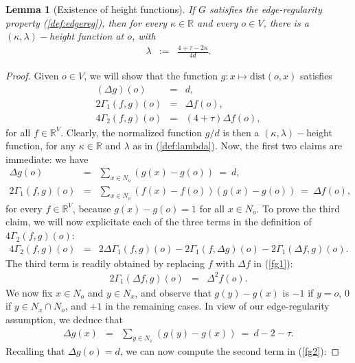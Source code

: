 \documentclass[12pt,final]{article}
\newtheorem{lemma}{Lemma}
\newcommand{\dR}{\mathbb {R}}
\newcommand{\dist}{{\mathrm{dist}}}
\begin{document}
\begin{lemma}[Existence of height functions]\label{lm:height}If  $G$ satisfies the edge-regularity property (\ref{def:edgereg}), then for every $\kappa\in\dR$ and every $o\in V$, there is a $(\kappa,\lambda)-$height function at $o$, with 
\begin{eqnarray}
\label{def:lambda}
\lambda & := & \frac{4+\tau-2\kappa}{4d}.
\end{eqnarray}
\end{lemma}
\begin{proof}
Given $o\in V$, we will show that the function  $g\colon x\mapsto \dist(o,x)$ satisfies
\begin{eqnarray}
(\Delta g)(o) & = & d,\\
2\Gamma_1(f,g)(o) & = & \Delta f(o),\\
4\Gamma_2(f,g)(o) & = &(4+\tau) \Delta f(o),
\end{eqnarray}
for all  $f\in \dR^V$. Clearly, the normalized function $g/d$ is then a $(\kappa,\lambda)-$height function, for any $\kappa\in\dR$ and $\lambda$ as in (\ref{def:lambda}). Now, the first two claims are immediate: we have
\begin{eqnarray}
\label{g}
\Delta g(o) & = & \sum_{x\in N_o}\left(g(x)-g(o)\right) \ = \ d,\\
\label{fg1}2\Gamma_1(f,g)(o) & = & \sum_{x\in N_o}\left(f(x)-f(o)\right)\left(g(x)-g(o)\right) \ = \ \Delta f(o),
\end{eqnarray}
for every  $f\in \dR^V$, because $g(x)-g(o)=1$ for all $x\in N_o$. To prove the third claim, we will now explicitate each of the three terms in the definition of $4\Gamma_2(f,g)(o)$:
\begin{eqnarray}
\label{fg2}
4\Gamma_2(f,g)(o) & = & 2\Delta\Gamma_1(f,g)(o)-2\Gamma_1(f,\Delta g)(o)-2\Gamma_1(\Delta f,g)(o).
\end{eqnarray}
The third term is readily obtained by replacing $f$ with $\Delta f$ in (\ref{fg1}):
\begin{eqnarray}
2\Gamma_1(\Delta f,g)(o) & = &  \Delta^2 f(o).
\end{eqnarray}
We now fix $x\in N_o$ and $y\in N_x$, and observe that $g(y)-g(x)$ is $-1$ if $y=o$, $0$ if $y\in N_x\cap N_o$, and $+1$ in the remaining cases. In view of our edge-regularity assumption, we deduce that
\begin{eqnarray*}
\Delta g(x) & = & \sum_{y\in N_x}\left(g(y)-g(x)\right) \ = \ d-2-\tau.
\end{eqnarray*}
Recalling that $\Delta g(o)=d$, we can now compute the second term in (\ref{fg2}):

\end{proof}
\end{document}
